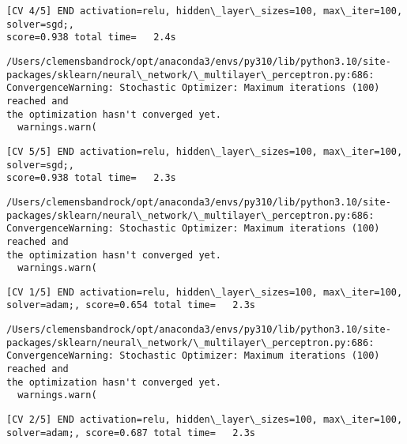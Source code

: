 \documentclass[11pt]{article}
\begin{document}
    \begin{Verbatim}[commandchars=\\\{\}]
[CV 4/5] END activation=relu, hidden\_layer\_sizes=100, max\_iter=100, solver=sgd;,
score=0.938 total time=   2.4s
    \end{Verbatim}

    \begin{Verbatim}[commandchars=\\\{\}]
/Users/clemensbandrock/opt/anaconda3/envs/py310/lib/python3.10/site-
packages/sklearn/neural\_network/\_multilayer\_perceptron.py:686:
ConvergenceWarning: Stochastic Optimizer: Maximum iterations (100) reached and
the optimization hasn't converged yet.
  warnings.warn(
    \end{Verbatim}

    \begin{Verbatim}[commandchars=\\\{\}]
[CV 5/5] END activation=relu, hidden\_layer\_sizes=100, max\_iter=100, solver=sgd;,
score=0.938 total time=   2.3s
    \end{Verbatim}

    \begin{Verbatim}[commandchars=\\\{\}]
/Users/clemensbandrock/opt/anaconda3/envs/py310/lib/python3.10/site-
packages/sklearn/neural\_network/\_multilayer\_perceptron.py:686:
ConvergenceWarning: Stochastic Optimizer: Maximum iterations (100) reached and
the optimization hasn't converged yet.
  warnings.warn(
    \end{Verbatim}

    \begin{Verbatim}[commandchars=\\\{\}]
[CV 1/5] END activation=relu, hidden\_layer\_sizes=100, max\_iter=100,
solver=adam;, score=0.654 total time=   2.3s
    \end{Verbatim}

    \begin{Verbatim}[commandchars=\\\{\}]
/Users/clemensbandrock/opt/anaconda3/envs/py310/lib/python3.10/site-
packages/sklearn/neural\_network/\_multilayer\_perceptron.py:686:
ConvergenceWarning: Stochastic Optimizer: Maximum iterations (100) reached and
the optimization hasn't converged yet.
  warnings.warn(
    \end{Verbatim}

    \begin{Verbatim}[commandchars=\\\{\}]
[CV 2/5] END activation=relu, hidden\_layer\_sizes=100, max\_iter=100,
solver=adam;, score=0.687 total time=   2.3s
    \end{Verbatim}
\end{document}
